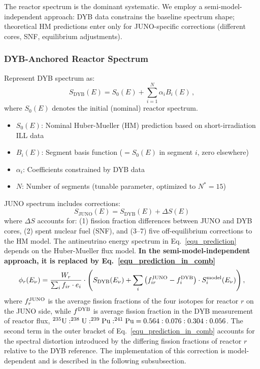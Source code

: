 The reactor spectrum is the dominant systematic. We employ a semi-model-independent
approach: DYB data constrains the baseline spectrum shape; theoretical HM predictions
enter only for JUNO-specific corrections (different cores, SNF, equilibrium adjustments).

\subsubsection{DYB-Anchored Reactor Spectrum}

Represent DYB spectrum as:
\begin{equation}
  S_{\text{DYB}}(E) = S_0(E) + \sum_{i=1}^{N} \alpha_i B_i(E)\,,
\end{equation}
where \(S_0(E)\) denotes the initial (nominal) reactor spectrum.

\begin{itemize}
  \item $S_0(E)$: Nominal Huber-Mueller (HM) prediction based on short-irradiation ILL data
  \item $B_i(E)$: Segment basis function ($= S_0(E)$ in segment $i$, zero elsewhere)
  \item $\alpha_i$: Coefficients constrained by DYB data
  \item $N$: Number of segments (tunable parameter, optimized to $N^* = 15$)
\end{itemize}

JUNO spectrum includes corrections:
\begin{equation}
  S_{\text{JUNO}}(E) = S_{\text{DYB}}(E) + \Delta S(E)
\end{equation}
where $\Delta S$ accounts for: (1) fission fraction differences between JUNO and DYB cores,
(2) spent nuclear fuel (SNF), and (3--7) five off-equilibrium corrections to the HM model. The antineutrino energy spectrum in Eq.~\eqref{equ_prediction} depends on the Huber-Mueller flux model. \textbf{In the semi-model-independent approach, it is replaced by Eq.~\eqref{equ_prediction_in_comb}}
\begin{equation}\label{equ_prediction_in_comb}
    \phi_r(E_{\nu}) = \frac{W_r}{\sum_i f_{ir} \cdot e_i} \cdot \left(S_{\rm DYB}(E_\nu)+\sum_i\left(f_{ir}^{\rm JUNO}-f_i^{\rm DYB}\right) \cdot S_{i}^{\rm model}(E_\nu)\right),
\end{equation}
where $f_{r}^{\rm JUNO}$ is the average fission fractions of the four isotopes for reactor $r$ on the JUNO side, while $f^{\rm DYB}$ is average fission fraction in the DYB measurement of reactor flux, $\rm ^{235}U : ^{238}U : ^{239}Pu : ^{241}Pu = 0.564:0.076:0.304:0.056$. The second term in the outer bracket of Eq.~\eqref{equ_prediction_in_comb} accounts for the spectral distortion introduced by the differing fission fractions of reactor $r$ relative to the DYB reference. The implementation of this correction is model-dependent and is described in the following subsubsection.

